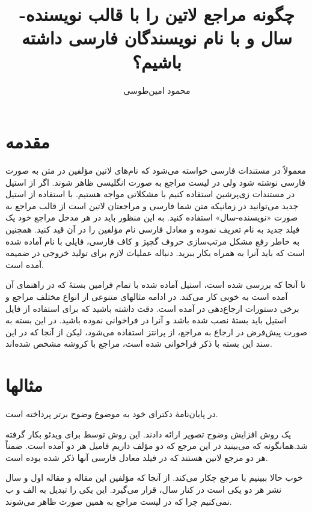 \documentclass{article}
\title{چگونه مراجع لاتین را با قالب نویسنده-سال و با نام نویسندگان فارسی داشته باشیم؟}
\author{محمود امین‌طوسی}%
\begin{document}
\maketitle
\section{مقدمه}
معمولاً در مستندات فارسی خواسته می‌شود که نام‌های لاتین مؤلفین در متن به صورت فارسی نوشته شود ولی در لیست مراجع به صورت انگلیسی ظاهر شوند. اگر از استیل  در مستندات زی‌پرشین استفاده کنیم با مشکلاتی مواجه هستیم. 
با استفاده از استیل جدید  می‌توانید در زمانیکه متن شما فارسی و مراجعتان لاتین است از قالب مراجع به صورت «نویسنده-سال» استفاده کنید. به این منظور باید در هر مدخل مراجع خود یک فیلد جدید به نام  تعریف نموده و معادل فارسی نام مؤلفین را در آن قید کنید. همچنین به خاطر رفع مشکل مرتب‌سازی حروف گچپژ و کاف فارسی، فایلی با نام  آماده شده است که باید آنرا به همراه  بکار ببرید.
دنباله عملیات لازم برای تولید خروجی در ضمیمه آمده است.

تا آنجا که بررسی شده است، استیل آماده شده با تمام فرامین بستهٔ  که در راهنمای آن آمده است به خوبی کار می‌کند. در ادامه مثالهای متنوعی از انواع مختلف مراجع و برخی دستورات ارجاع‌دهی در  آمده است. دقت داشته باشید که  برای استفاده از فایل استیل  باید بستهٔ  نصب شده باشد و آنرا در فراخوانی نموده باشید. در این بسته به صورت پیش‌فرض در ارجاع به مراجع، از پرانتز استفاده می‌شود، لیکن از آنجا که در این سند این بسته با ذکر \lr{[square]} فراخوانی شده است، مراجع با کروشه مشخص شده‌اند. 
\section{مثالها}

\cite{Borman04thesis} در پایان‌نامهٔ دکترای خود به موضوع وضوح برتر پرداخته است.

\cite{Amintoosi09precise} یک روش افزایش وضوح تصویر ارائه دادند. این روش توسط \cite{Amintoosi09video} برای ویدئو بکار گرفته شد.همانگونه که می‌بینید در این مرجع که دو مؤلف داریم فامیل هر دو آمده است. ضمناً هر دو مرجع لاتین هستند که در فیلد  معادل فارسی آنها ذکر شده بوده است.

خوب حالا ببینیم با مرجع \cite{Amintoosi09regional} چکار می‌کند. از آنجا که مؤلفین این مقاله و مقاله اول و سال نشر هر دو یکی است در کنار سال،  قرار می‌گیرد. این یکی را تبدیل به الف و ب نمی‌کنیم چرا که در لیست مراجع به همین صورت ظاهر می‌شوند.
\end{document}
